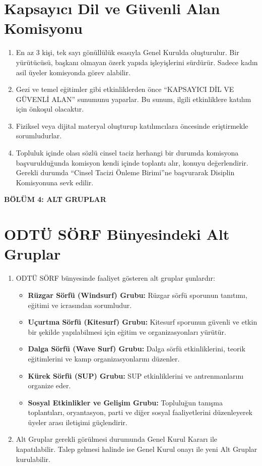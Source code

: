 \documentclass[11pt,a4paper]{article}
\begin{document}
\section{Kapsayıcı Dil ve Güvenli Alan Komisyonu}
\begin{enumerate}
    \item En az 3 kişi, tek sayı gönüllülük esasıyla Genel Kurulda oluşturulur. Bir yürütücüsü, başkanı olmayan özerk yapıda işleyişlerini sürdürür. Sadece kadın asil üyeler komisyonda görev alabilir.
    \item Gezi ve temel eğitimler gibi etkinliklerden önce “KAPSAYICI DİL VE GÜVENLİ ALAN” sunumunu yaparlar. Bu sunum, ilgili etkinliklere katılım için önkoşul olacaktır.
    \item Fiziksel veya dijital materyal oluşturup katılımcılara öncesinde eriştirmekle sorumludurlar.
    \item Topluluk içinde olası sözlü cinsel taciz herhangi bir durumda komisyona başvurulduğunda komisyon kendi içinde toplantı alır, konuyu değerlendirir. Gerekli durumda “Cinsel Tacizi Önleme Birimi”ne başvurarak Disiplin Komisyonuna sevk edilir.
\end{enumerate}


\begin{center}
    {\Large \textbf{BÖLÜM 4: ALT GRUPLAR}}
\end{center}
\vspace{0.5cm}

\section{ODTÜ SÖRF Bünyesindeki Alt Gruplar}
\begin{enumerate}
    \item ODTÜ SÖRF bünyesinde faaliyet gösteren alt gruplar şunlardır:
    \begin{itemize}
        \item \textbf{Rüzgar Sörfü (Windsurf) Grubu:} Rüzgar sörfü sporunun tanıtımı, eğitimi ve icrasından sorumludur.
        \item \textbf{Uçurtma Sörfü (Kitesurf) Grubu:} Kitesurf sporunun güvenli ve etkin bir şekilde yapılabilmesi için eğitim ve organizasyonları yürütür.
        \item \textbf{Dalga Sörfü (Wave Surf) Grubu:} Dalga sörfü etkinliklerini, teorik eğitimlerini ve kamp organizasyonlarını düzenler.
        \item \textbf{Kürek Sörfü (SUP) Grubu:} SUP etkinliklerini ve antrenmanlarını organize eder.
        \item \textbf{Sosyal Etkinlikler ve Gelişim Grubu:} Topluluğun tanışma toplantıları, oryantasyon, parti ve diğer sosyal faaliyetlerini düzenleyerek üyeler arası iletişimi güçlendirir.
    \end{itemize}
    \item Alt Gruplar gerekli görülmesi durumunda Genel Kurul Kararı ile kapatılabilir. Talep gelmesi halinde ise Genel Kurul onayı ile yeni Alt Gruplar kurulabilir.
\end{enumerate}
\end{document}

